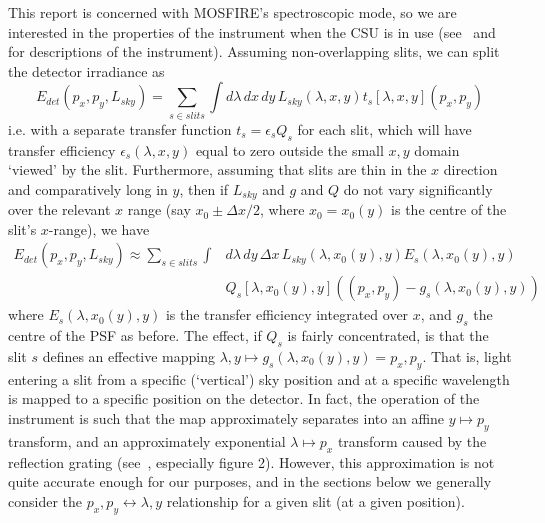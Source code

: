
This report is concerned with MOSFIRE's spectroscopic mode, so we are
interested in the properties of the instrument when the CSU is in use
(see~\cite{surfreport} and~\cite{mosfirepaper} for descriptions of the
instrument). Assuming non-overlapping slits, we can split the detector
irradiance as
\[
E_{det}(p_x, p_y, L_{sky}) = \sum_{s \in slits} \int d\lambda\, dx\, dy\, L_{sky}(\lambda, x, y) t_s[\lambda, x, y](p_x, p_y)
\]
i.e. with a separate transfer function $t_s = \epsilon_s Q_s$ for each
slit, which will have transfer efficiency $\epsilon_s (\lambda, x,
y)$ equal to zero outside the small $x,y$ domain `viewed' by the slit.
Furthermore, assuming that slits are thin in the $x$ direction and
comparatively long in $y$, then if $L_{sky}$ and $g$ and $Q$ do not vary
significantly over the relevant $x$ range (say $x_0 \pm \Delta x / 2$, where
$x_0 = x_0(y)$ is the centre of the slit's $x$-range),
we have
\begin{align*}
E_{det}(p_x, p_y, L_{sky}) \approx
\sum_{s \in slits} \int &d\lambda\, dy\, \Delta x\, L_{sky}(\lambda, x_0(y), y)
E_s(\lambda, x_0(y), y) \\
& Q_s[\lambda, x_0(y), y]((p_x, p_y) - g_s (\lambda, x_0(y), y))
\end{align*}
where $E_s(\lambda, x_0(y), y)$ is the transfer efficiency integrated
over $x$, and $g_s$ the centre of the PSF as before. The effect, if
$Q_s$ is fairly concentrated, is that the slit $s$ defines an effective
mapping $\lambda, y \mapsto g_s (\lambda, x_0(y), y) = p_x, p_y$. That
is, light entering a slit from a specific (`vertical') sky position
and at a specific wavelength is mapped to a specific position on the
detector. In fact, the operation of the instrument is such that the map
approximately separates into an affine $y \mapsto p_y$ transform, and
an approximately exponential $\lambda \mapsto p_x$ transform caused
by the reflection grating (see~\cite{surfreport}, especially figure
2). However, this approximation is not quite accurate enough for our
purposes, and in the sections below we generally consider the $p_x, p_y
\leftrightarrow \lambda, y$ relationship for a given slit (at a given
position).

